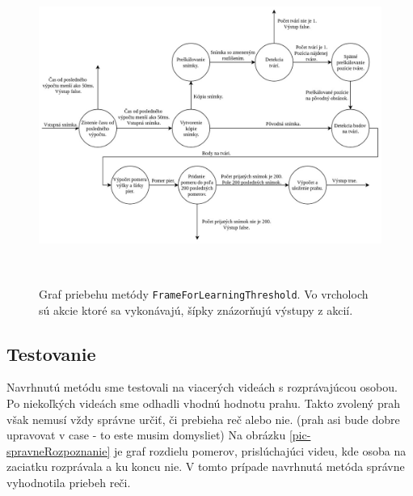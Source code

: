 \begin{figure}[H]
	\begin{center}
		\includegraphics[height=10.3cm]{pics/FrameForLearningThreshold.jpg}
		\caption{Graf priebehu metódy \texttt{FrameForLearningThreshold}. Vo vrcholoch sú akcie ktoré sa vykonávajú, šípky znázorňujú výstupy z akcií.}
		\label{pic-Frame}
	\end{center}
\end{figure}
\subsection{Testovanie}

Navrhnutú metódu sme testovali na viacerých videách s rozprávajúcou osobou.
Po niekoľkých videách sme odhadli vhodnú hodnotu prahu. 
Takto zvolený prah však nemusí vždy správne určiť, či prebieha reč alebo nie.
(prah asi bude dobre upravovat v case - to este musim domysliet)
Na obrázku \ref{pic-spravneRozpoznanie} je graf rozdielu pomerov, prislúchajúci videu, kde osoba na zaciatku rozprávala a ku koncu nie. 
V tomto prípade navrhnutá metóda správne vyhodnotila priebeh reči.

